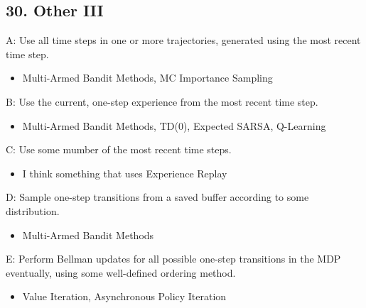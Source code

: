 \documentclass[letterpaper,10pt]{article}
\begin{document}
\begin{multicols}{2}
\section*{30. Other III}
\noindent A: Use all time steps in one or more trajectories, generated using the most recent time step.
\begin{itemize}
    \item Multi-Armed Bandit Methods, MC Importance Sampling
\end{itemize}

\noindent B: Use the current, one-step experience from the most recent time step.
\begin{itemize}
    \item Multi-Armed Bandit Methods, TD(0), Expected SARSA, Q-Learning
\end{itemize}

\noindent C: Use some mumber of the most recent time steps.
\begin{itemize}
    \item I think something that uses Experience Replay
\end{itemize}

\noindent D: Sample one-step transitions from a saved buffer according to some distribution.
\begin{itemize}
    \item Multi-Armed Bandit Methods
\end{itemize}

\noindent E: Perform Bellman updates for all possible one-step transitions in the MDP eventually, using some well-defined ordering method.
\begin{itemize}
    \item Value Iteration, Asynchronous Policy Iteration
\end{itemize}


\end{multicols}
\end{document}
